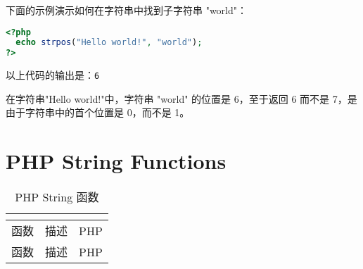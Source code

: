 下面的示例演示如何在字符串中找到子字符串 "world"：



\begin{lstlisting}[language=PHP]
<?php
  echo strpos("Hello world!", "world");
?>
\end{lstlisting}

以上代码的输出是：\verb|6|

在字符串"Hello world!"中，字符串 "world" 的位置是 6，至于返回 6 而不是 7，是由于字符串中的首个位置是 0，而不是 1。


\section{PHP String Functions}



\begin{longtable}{|m{120pt}|m{250pt}|m{20pt}|}
\multicolumn{3}{r}{}
\tabularnewline\hline
函数	&描述	&PHP
\endhead

\caption{PHP String 函数}\\
\hline
函数	&描述	&PHP
\endfirsthead

\multicolumn{3}{r}{}
\endfoot

\endlastfoot


\end{longtable}
